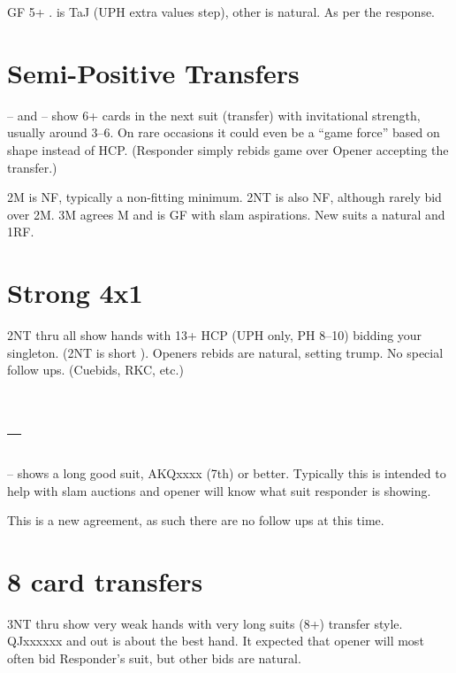 \documentclass[tom-ari]{subfile}
\begin{document}
	
	GF 5+ \diamondsuit.   is TaJ (UPH extra values step), other is natural.  As per the  response. 
	
	\section{Semi-Positive Transfers}
	
	-- and -- show 6+ cards in the next suit (transfer) with invitational strength, usually around 3--6.  On rare occasions it could even be a ``game force'' based on shape instead of HCP.  (Responder simply rebids game over Opener accepting the transfer.)
	
	2M is NF, typically a non-fitting minimum.  2NT is also NF, although rarely bid over 2M.  3M agrees M and is GF with slam aspirations. New suits a natural and 1RF.
	
	\section{Strong 4x1}
	
	2NT thru  all show  hands with 13+ HCP (UPH only, PH 8--10) bidding your singleton. (2NT is short \spadesuit). Openers rebids are natural, setting trump.  No special follow ups.  (Cuebids, RKC, etc.)
	  
 	\section[1C--3S]{--}
 	
 	-- shows a long good suit, AKQxxxx (7th) or better.  Typically this is intended to help with slam auctions and opener will know what suit responder is showing.
 	
 	This is a new agreement, as such there are no follow ups at this time.
 	
 	\section{8 card transfers}
 	
 	3NT thru  show very weak hands with very long suits (8+) transfer style.  QJxxxxxx and out is about the best hand.  It expected that opener will most often bid Responder's suit, but other bids are natural.
 	
\end{document}
